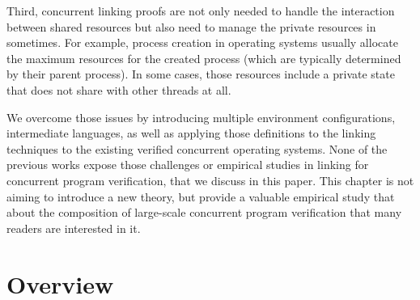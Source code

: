 Third, 
concurrent linking proofs are not only needed to handle the interaction between shared resources but also need to manage the private resources in sometimes. 
For example, process creation in operating systems usually allocate the maximum resources 
for the created process (which are typically determined by their parent process).
In some cases, those resources include a private state that does not share with other threads at all. 



We overcome those issues by introducing multiple environment configurations, intermediate languages, 
as well as applying those definitions to the linking techniques to the existing verified concurrent operating systems. 
None of the previous works expose those challenges or empirical studies in linking for concurrent program verification,
that we discuss in this paper.
This chapter is not aiming to introduce a new theory, 
but provide a valuable empirical study that 
about the composition of large-scale concurrent program verification that many readers are interested in it.


\section{Overview}
\label{chapter:conlink:sec:overview}




